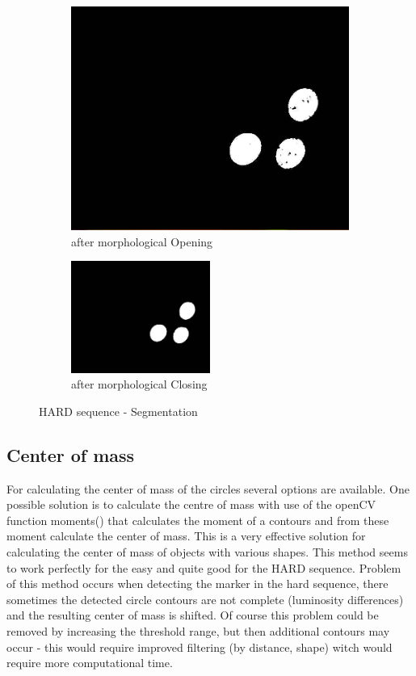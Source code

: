 \begin{figure}[ht!]
\begin{subfigure}{.49\textwidth}
		\centering
		\includegraphics[width=\textwidth]{figures/color3}
	\caption{after morphological Opening}
	\label{fig:c3}
	\end{subfigure}
	\begin{subfigure}{\textwidth}
		\centering
\includegraphics[width=0.5\textwidth]{figures/color4}
	\caption{after morphological Closing}
	\label{fig:c4}
	\end{subfigure}
\caption{HARD sequence - Segmentation}
\label{fig:markerColorSegmenation}
\end{figure}

\subsection{Center of mass}
For calculating the center of mass of the circles several options are available.
One possible solution is to calculate the centre of mass with use of the openCV function
moments() that calculates the moment of a contours and from these moment calculate the
center of mass. This is a very effective solution for calculating the center of mass of
objects with various shapes. This method seems to work perfectly for the easy and quite good
for the HARD sequence. Problem of this method occurs when detecting the marker in the hard sequence,
there sometimes the detected circle contours are not complete (luminosity differences) and the resulting
center of mass is shifted. Of course this problem could be removed by increasing the threshold range, but
then additional contours may occur - this would require improved filtering (by distance, shape) witch would
require more computational time. 



